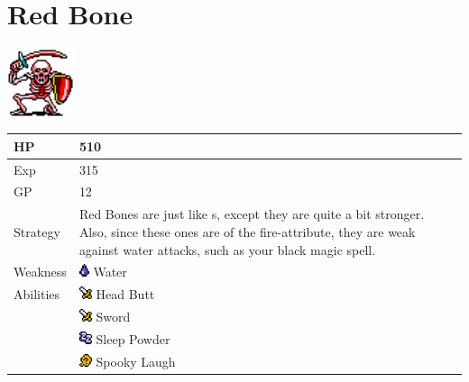 \section{Red Bone}
\label{monster:red_bone}

\includegraphics[height=2cm,keepaspectratio]{./resources/monster/red_bone}

\begin{longtable}{ l p{9cm} }
	HP
	& 510
\\ \hline
	Exp
	& 315
\\ \hline
	GP
	& 12
\\ \hline
	Strategy
	& Red Bones are just like \nameref{monster:skeleton}s, except they are quite a bit stronger. Also, since these ones are of the fire-attribute, they are weak against water attacks, such as your \nameref{spell:blizzard} black magic spell.
\\ \hline
	Weakness
	& \includegraphics[height=1em,keepaspectratio]{./resources/effects/water} Water
\\ \hline
	Abilities
	& \includegraphics[height=1em,keepaspectratio]{./resources/effects/damage} Head Butt \\
	& \includegraphics[height=1em,keepaspectratio]{./resources/effects/damage} Sword \\
	& \includegraphics[height=1em,keepaspectratio]{./resources/effects/sleep} Sleep Powder \\
	& \includegraphics[height=1em,keepaspectratio]{./resources/effects/confusion} Spooky Laugh
\end{longtable}
